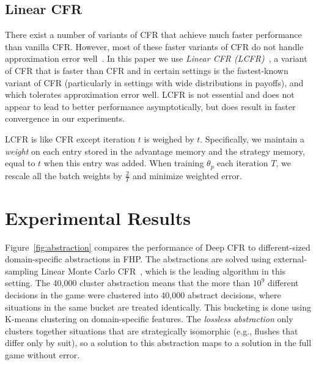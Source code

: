 \documentclass{article}
\newcommand{\adam}[1]{\textbf{\textcolor{magenta}{#1}}}
\begin{document}
\subsection{Linear CFR}
\vspace{-0.03in}
There exist a number of variants of CFR that achieve much faster performance than vanilla CFR. However, most of these faster variants of CFR do not handle approximation error well~\cite{Tammelin15:Solving,Burch17:Time,Brown19:Solving,Schmid19:Variance}. In this paper we use \emph{Linear CFR (LCFR)}~\cite{Brown19:Solving}, a variant of CFR that is faster than CFR and in certain settings is the fastest-known variant of CFR (particularly in settings with wide distributions in payoffs), and which tolerates approximation error well. LCFR is not essential and does not appear to lead to better performance asymptotically, but does result in faster convergence in our experiments.

LCFR is like CFR except iteration $t$ is weighed by $t$. Specifically, we maintain a \emph{weight} on each entry stored in the advantage memory and the strategy memory, equal to $t$ when this entry was added. When training $\theta_p$ each iteration $T$, we rescale all the batch weights by $\frac{2}{T}$ and minimize weighted error.



\section{Experimental Results}
\vspace{-0.03in}
Figure~\ref{fig:abstraction} compares the performance of Deep CFR to different-sized domain-specific abstractions in FHP. The abstractions are solved using external-sampling Linear Monte Carlo CFR~\cite{Lanctot09:Monte,Brown19:Solving}, which is the leading algorithm in this setting. The 40,000 cluster abstraction means that the more than $10^9$ different decisions in the game were clustered into 40,000 abstract decisions, where situations in the same bucket are treated identically. This bucketing is done using K-means clustering on domain-specific features. The \emph{lossless abstraction} only clusters together situations that are strategically isomorphic (e.g., flushes that differ only by suit), so a solution to this abstraction maps to a solution in the full game without error.
\end{document}
